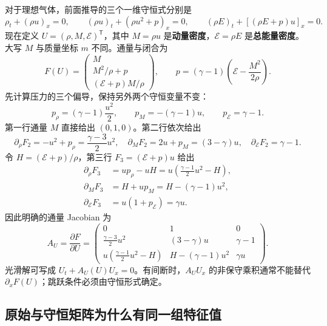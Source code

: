对于理想气体，前面推导的三个一维守恒式分别是
\begin{equation}
 \rho_t+(\rho u)_x=0,\qquad
 (\rho u)_t+(\rho u^2+p)_x=0,\qquad
 (\rho E)_t+[(\rho E+p)u]_x=0.
\end{equation}
现在定义 $U=(\rho,M,\mathcal E)^{\mathsf T}$，其中 $M=\rho u$ 是\textbf{动量密度}，$\mathcal E=\rho E$ 是\textbf{总能量密度}。大写 $M$ 与质量坐标 $m$ 不同。通量与闭合为
\begin{equation}
 F(U)=\begin{pmatrix}M\\M^2/\rho+p\\(\mathcal E+p)M/\rho\end{pmatrix},
 \qquad p=(\gamma-1)\left(\mathcal E-\frac{M^2}{2\rho}\right).
\end{equation}
先计算压力的三个偏导，保持另外两个守恒变量不变：
\begin{equation}
 p_\rho=(\gamma-1)\frac{u^2}{2},\qquad
 p_M=-(\gamma-1)u,\qquad p_{\mathcal E}=\gamma-1.
\end{equation}
第一行通量 $M$ 直接给出 $(0,1,0)$。第二行依次给出
\begin{equation}
 \partial_\rho F_2=-u^2+p_\rho=\frac{\gamma-3}{2}u^2,\quad
 \partial_MF_2=2u+p_M=(3-\gamma)u,\quad
 \partial_{\mathcal E}F_2=\gamma-1.
\end{equation}
令 $H=(\mathcal E+p)/\rho$，第三行 $F_3=(\mathcal E+p)u$ 给出
\begin{align}
 \partial_\rho F_3&=u p_\rho-uH
 =u\left(\frac{\gamma-1}{2}u^2-H\right),\\
 \partial_MF_3&=H+u p_M=H-(\gamma-1)u^2,\\
 \partial_{\mathcal E}F_3&=u(1+p_{\mathcal E})=\gamma u.
\end{align}
因此明确的通量 Jacobian 为
\begin{equation}
 A_U=\frac{\partial F}{\partial U}
 =\begin{pmatrix}
 0&1&0\\
 \frac{\gamma-3}{2}u^2&(3-\gamma)u&\gamma-1\\
 u(\frac{\gamma-1}{2}u^2-H)&H-(\gamma-1)u^2&\gamma u
 \end{pmatrix}.\label{eq:conservative-euler-jacobian}
\end{equation}
光滑解可写成 $U_t+A_U(U)U_x=0$。有间断时，$A_UU_x$ 的非保守乘积通常不能替代 $\partial_xF(U)$；跳跃条件必须由守恒形式确定。

\subsection{原始与守恒矩阵为什么有同一组特征值}

